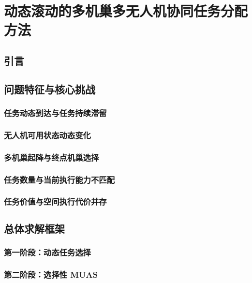 \chapter{动态滚动的多机巢多无人机协同任务分配方法}

\section{引言}

\section{问题特征与核心挑战}
\subsection{任务动态到达与任务持续滞留}
\subsection{无人机可用状态动态变化}
\subsection{多机巢起降与终点机巢选择}
\subsection{任务数量与当前执行能力不匹配}
\subsection{任务价值与空间执行代价并存}

\section{总体求解框架}
\subsection{第一阶段：动态任务选择}
\subsection{第二阶段：选择性 MUAS}

